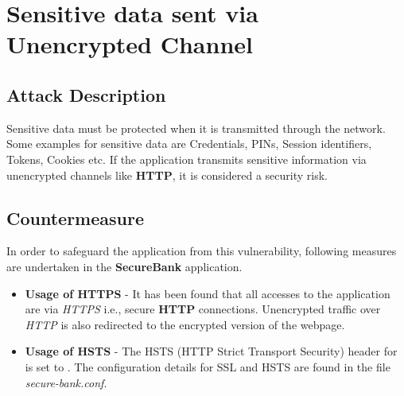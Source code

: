 \section{Sensitive data sent via Unencrypted Channel}

\subsection{Attack Description}
Sensitive data must be protected when it is transmitted through the network. Some examples for sensitive data are Credentials, PINs, Session identifiers, Tokens, Cookies etc.
If the application transmits sensitive information via unencrypted channels like \textbf{HTTP}, it is considered a security risk.

\subsection{Countermeasure}
In order to safeguard the application from this vulnerability, following measures are undertaken in the \textbf{SecureBank} application.
\begin{itemize}
\item \textbf{Usage of HTTPS} - It has been found that all accesses to the application are via
\textit{HTTPS} i.e., secure \textbf{HTTP} connections. Unencrypted traffic over \textit{HTTP} is
also redirected to the encrypted version of the webpage.
\item \textbf{Usage of HSTS} - The HSTS (HTTP Strict Transport Security) header for \\  is set to . The  configuration details for SSL and HSTS are found in the file \textit{secure-bank.conf}.
\end{itemize}

\clearpage